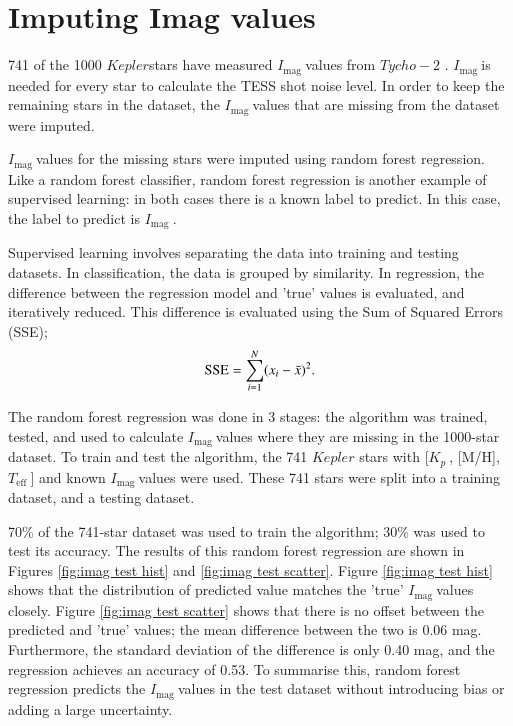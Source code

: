 \documentclass[a4paper,fleqn,usenatbib,useAMS]{mnras}
\newcommand{\teff}{\ensuremath{T_{\textrm{eff}}\:}}
\newcommand{\kep}{\ensuremath{Kepler}\:}
\newcommand{\kp}{\ensuremath{K_{p}\:}}
\newcommand{\imag}{\ensuremath{I_{\textrm{mag}}\:}}
\begin{document}
\section{Imputing Imag values}
\label{sect: impute}

741 of the 1000 \kep stars have measured \imag values from $Tycho-2$ \citep{hog_tycho-2_2000}. \imag is needed for every star to calculate the TESS shot noise level. In order to keep the remaining stars in the dataset, the \imag values that are missing from the dataset were imputed.

\imag values for the missing stars were imputed using random forest regression. Like a random forest classifier, random forest regression is another example of supervised learning: in both cases there is a known label to predict. In this case, the label to predict is \imag.

Supervised learning involves separating the data into training and testing datasets. In classification, the data is grouped by similarity. In regression, the difference between the regression model and 'true' values is evaluated, and iteratively reduced. This difference is evaluated using the Sum of Squared Errors (SSE);
\begin{equation}
{\rm SSE} = \sum_{i=1}^{N} (x_{i} - \bar{x})^{2}.
\end{equation}

The random forest regression was done in 3 stages: the algorithm was trained, tested, and used to calculate \imag values where they are missing in the 1000-star dataset. To train and test the algorithm, the 741 $Kepler$ stars with [\kp, [M/H], \teff] and known \imag values were used. These 741 stars were split into a training dataset, and a testing dataset.

70\% of the 741-star dataset was used to train the algorithm; 30\% was used to test its accuracy. The results of this random forest regression are shown in Figures \ref{fig:imag test hist} and \ref{fig:imag test scatter}. Figure \ref{fig:imag test hist} shows that the distribution of predicted value matches the 'true' \imag values closely. Figure \ref{fig:imag test scatter} shows that there is no offset between the predicted and 'true' values; the mean difference between the two is 0.06 mag. Furthermore, the standard deviation of the difference is only 0.40 mag, and the regression achieves an accuracy of 0.53. To summarise this, random forest regression predicts the \imag values in the test dataset without introducing bias or adding a large uncertainty.
\end{document}
